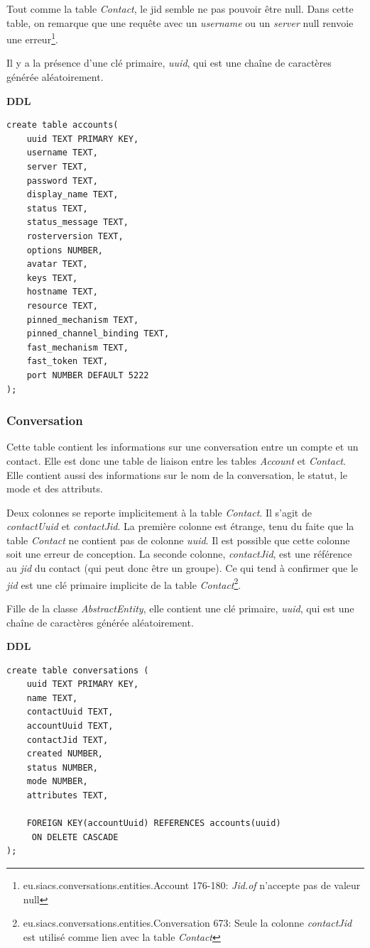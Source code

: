 \documentclass[a4paper,11pt]{article}
\begin{document}
Tout comme la table \textit{Contact}, le jid semble ne pas pouvoir être null. Dans cette table, on remarque que une requête avec un \textit{username} ou un \textit{server} null renvoie une erreur\footnote{eu.siacs.conversations.entities.Account 176-180: \textit{Jid.of} n'accepte pas de valeur null}.

Il y a la présence d'une clé primaire, \textit{uuid}, qui est une chaîne de caractères générée aléatoirement. 

\textbf{DDL}
\begin{lstlisting}
create table accounts(
    uuid TEXT PRIMARY KEY,
    username TEXT,
    server TEXT,
    password TEXT,
    display_name TEXT,
    status TEXT,
    status_message TEXT,
    rosterversion TEXT,
    options NUMBER,
    avatar TEXT,
    keys TEXT,
    hostname TEXT,
    resource TEXT,
    pinned_mechanism TEXT,
    pinned_channel_binding TEXT,
    fast_mechanism TEXT,
    fast_token TEXT,
    port NUMBER DEFAULT 5222
);
\end{lstlisting}
\subsubsection{Conversation}

Cette table contient les informations sur une conversation entre un compte et un contact. Elle est donc une table de liaison entre les tables \textit{Account} et \textit{Contact}. Elle contient aussi des informations sur le nom de la conversation, le statut, le mode et des attributs.

Deux colonnes se reporte implicitement à la table \textit{Contact}. Il s'agit de \textit{contactUuid} et \textit{contactJid}. La première colonne est étrange, tenu du faite que la table \textit{Contact} ne contient pas de colonne \textit{uuid}. Il est possible que cette colonne soit une erreur de conception. La seconde colonne, \textit{contactJid}, est une référence au \textit{jid} du contact (qui peut donc être un groupe). Ce qui tend à confirmer que le \textit{jid} est une clé primaire implicite de la table \textit{Contact}\footnote{eu.siacs.conversations.entities.Conversation 673: Seule la colonne \textit{contactJid} est utilisé comme lien avec la table \textit{Contact}}.

Fille de la classe \textit{AbstractEntity}, elle contient une clé primaire, \textit{uuid}, qui est une chaîne de caractères générée aléatoirement.

\textbf{DDL}
\begin{lstlisting}
create table conversations (
    uuid TEXT PRIMARY KEY,
    name TEXT,
    contactUuid TEXT,
    accountUuid TEXT,
    contactJid TEXT,
    created NUMBER,
    status NUMBER,
    mode NUMBER,
    attributes TEXT, 
    
    FOREIGN KEY(accountUuid) REFERENCES accounts(uuid)
     ON DELETE CASCADE
);
\end{lstlisting}
\end{document}
